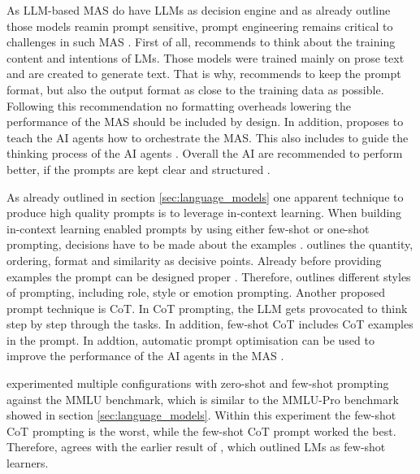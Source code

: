 \documentclass[a4paper,oneside,bibliography=totoc]{scrbook}
\begin{document}
As \ac{LLM}-based \ac{MAS} do have \acp{LLM} as decision engine and as already outline those models reamin prompt sensitive, prompt engineering remains critical to challenges in such \ac{MAS} \cite{OpenAI2025}. First of all, \citet{Anthropic2024} recommends to think about the training content and intentions of \acp{LM}. Those models were trained mainly on prose text and are created to generate text. That is why, \citet{Anthropic2024} recommends to keep the prompt format, but also the output format as close to the training data as possible. Following this recommendation no formatting overheads lowering the performance of the \ac{MAS} should be included by design. In addition, \citet{Hadfield2025} proposes to teach the \ac{AI} agents how to orchestrate the \ac{MAS}. This also includes to guide the thinking process of the \ac{AI} agents \cite{Anthropic2024}. Overall the \ac{AI} are recommended to perform better, if the prompts are kept clear and structured \cite{OpenAI2025}.

As already outlined in section \ref{sec:language_models} one apparent technique to produce high quality prompts is to leverage in-context learning. When building in-context learning enabled prompts by using either few-shot or one-shot prompting, decisions have to be made about the examples \cite{Schulhoff2025}. \citet{Schulhoff2025} outlines the quantity, ordering, format and similarity as decisive points. Already before providing examples the prompt can be designed proper \cite{Schulhoff2025}. Therefore, \citet{Schulhoff2025} outlines different styles of prompting, including role, style or emotion prompting. Another proposed prompt technique is \ac{CoT}. In \ac{CoT} prompting, the \ac{LLM} gets provocated to think step by step through the tasks. In addition, few-shot \ac{CoT} includes \ac{CoT} examples in the prompt. In addtion, automatic prompt optimisation can be used to improve the performance of the \ac{AI} agents in the \ac{MAS} \cite{Schulhoff2025}.

\citet{Schulhoff2025} experimented multiple configurations with zero-shot and few-shot prompting against the MMLU benchmark, which is similar to the MMLU-Pro benchmark showed in section \ref{sec:language_models}. Within this experiment the few-shot \ac{CoT} prompting is the worst, while the few-shot \ac{CoT} prompt worked the best. Therefore, \citet{Schulhoff2025} agrees with the earlier result of \citet{Brown2020}, which outlined \acp{LM} as few-shot learners.
\end{document}
